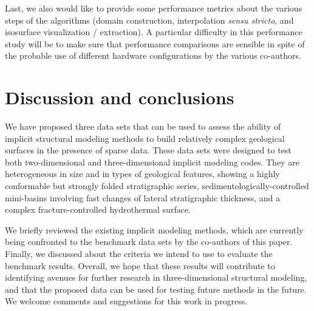 \documentclass[final]{ring20}
\begin{document}
{Last, we also would like to provide some performance metrics about the various steps of the algorithms (domain construction, interpolation \textit{sensu stricto}, and isosurface visualization / extraction). A particular difficulty in this performance study will be to make sure that performance comparisons are sensible in spite of the probable use of different hardware configurations by the various co-authors. 

 


\section*{Discussion and conclusions}
\label{sec:conclu}
We have proposed three data sets that can be used to assess the ability of implicit structural modeling methods to build relatively complex geological surfaces in the presence of sparse data. These data sets were designed to test both two-dimensional and three-dimensional implicit modeling codes. They are heterogeneous in size and in types of geological features, showing a highly conformable but strongly folded stratigraphic series, sedimentologically-controlled mini-basins involving fast changes of lateral stratigraphic thickness, and a complex fracture-controlled hydrothermal surface. 

We briefly reviewed the existing implicit modeling methods, which are currently being confronted to the benchmark data sets by the co-authors of this paper. Finally, we discussed about the criteria we intend to use to evaluate the benchmark results. 
Overall, we hope that these results will contribute to identifying avenues for further research in three-dimensional structural modeling, and that the proposed data can be used for testing future methods in the future. We welcome comments and suggestions for this work in progress. 

}
\end{document}
